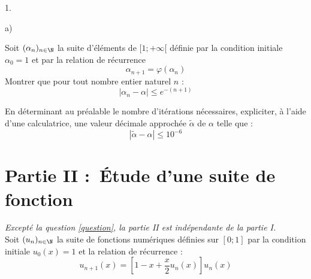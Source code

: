 \documentclass[11pt]{article}%
\begin{document}
\begin{noliste}{1.}
\begin{noliste}{a)}
\item Soit $(\alpha_{n})_{n\in \N}$ la suite d'éléments de $[1; +
\infty \lbrack $ définie par la condition initiale $\alpha_{0} = 1$ et
par la relation de récurrence 
\[
\alpha_{n + 1} = \varphi (\alpha_{n})
\]
Montrer que pour tout nombre entier naturel $n$ : 
\[
\left| \alpha_{n}-\alpha \right| \leq e^{-(n + 1)}
\]

\item En déterminant au préalable le nombre d'itérations nécessaires,
expliciter, à l'aide d'une calculatrice, une valeur décimale approchée
$\tilde{\alpha}$ de $\alpha $ telle que : 
\[
\left| \tilde{\alpha}-\alpha \right| \leq 10^{-6}
\]
\end{noliste}
\end{noliste}

\section*{Partie II :\hspace{0.2cm}\ Étude d'une suite de
fonction\protect\vspace{0.1cm}}

\emph{Excepté la question \ref{question}, la partie II est indépendante
de
la partie I.}\\
Soit $(u_{n})_{n\in \N}$ la suite de fonctions numériques définies
sur $[0;1]$ par la condition initiale $u_{0}(x) = 1$ et la relation de
récurrence : 
\[
u_{n + 1}(x) = \left[ 1-x + \dfrac{x}{2}u_{n}(x)\right] u_{n}(x)
\]
\end{document}
